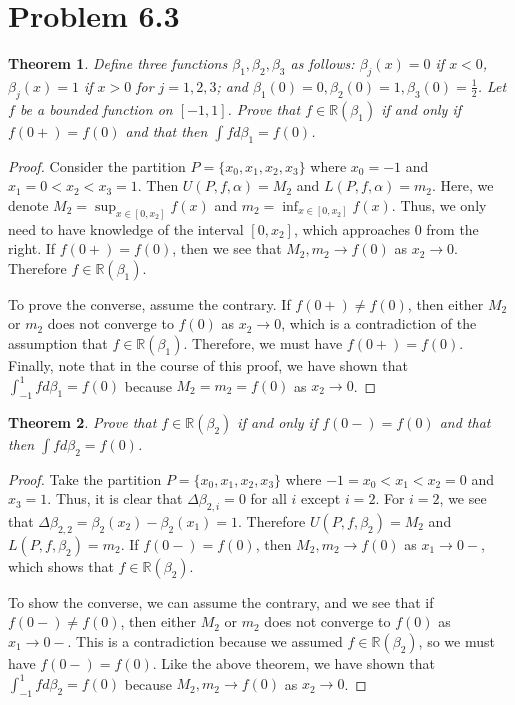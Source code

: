\documentclass[psamsfonts]{amsart}
\newtheorem{thm}{Theorem}[section]
\theoremstyle{definition}
\theoremstyle{remark}
\numberwithin{equation}{section}
\begin{document}
\section{Problem 6.3}

\begin{thm}
Define three functions $\beta_1, \beta_2, \beta_3$ as follows: $\beta_j(x) = 0$ if $x < 0$, $\beta_j(x) = 1$ if $x > 0$ for $j = 1,2,3$; and $\beta_1(0) = 0, \beta_2(0) = 1, \beta_3(0) = \frac{1}{2}$. Let $f$ be a bounded function on $[-1,1]$. Prove that $f \in \mathbb{R}(\beta_1)$ if and only if $f(0+) = f(0)$ and that then $\int f d\beta_1 = f(0)$.
\end{thm}

\begin{proof}
Consider the partition $P = \{ x_0, x_1, x_2, x_3 \}$ where $x_0 = -1$ and $x_1 = 0 < x_2 < x_3 = 1$. Then $U(P,f,\alpha) = M_2$ and $L(P,f,\alpha) = m_2$. Here, we denote $M_2 = \sup_{x \in [0,x_2]} f(x)$ and $m_2 = \inf_{x \in [0,x_2]} f(x)$. Thus, we only need to have knowledge of the interval $[0,x_2]$, which approaches $0$ from the right. If $f(0+) = f(0)$, then we see that $M_2, m_2 \to f(0)$ as $x_2 \to 0$. Therefore $f \in \mathbb{R}(\beta_1)$. 

To prove the converse, assume the contrary. If $f(0+) \neq f(0)$, then either $M_2$ or $m_2$ does not converge to $f(0)$ as $x_2 \to 0$, which is a contradiction of the assumption that $f \in \mathbb{R}(\beta_1)$. Therefore, we must have $f(0+) = f(0)$. Finally, note that in the course of this proof, we have shown that $\int_{-1}^1 f d \beta_1 = f(0)$ because $M_2 = m_2 = f(0)$ as $x_2 \to 0$. 
\end{proof}

\begin{thm}
Prove that $f \in \mathbb{R}(\beta_2)$ if and only if $f(0-) = f(0)$ and that then $\int f d \beta_2 = f(0)$. 
\end{thm}

\begin{proof}
Take the partition $P = \{ x_0, x_1, x_2, x_3 \}$ where $-1 = x_0 < x_1 < x_2 = 0$ and $x_3 = 1$. Thus, it is clear that $\Delta \beta_{2,i} = 0$ for all $i$ except $i=2$. For $i=2$, we see that $\Delta \beta_{2,2} = \beta_{2}(x_2) - \beta_2(x_1) = 1$. Therefore $U(P,f,\beta_2) = M_2$ and $L(P,f,\beta_2) = m_2$. If $f(0-) = f(0)$, then $M_2,m_2 \to f(0)$ as $x_1 \to 0-$, which shows that $f \in \mathbb{R}(\beta_2)$. 

To show the converse, we can assume the contrary, and we see that if $f(0-) \neq f(0)$, then either $M_2$ or $m_2$ does not converge to $f(0)$ as $x_1 \to 0-$. This is a contradiction because we assumed $f \in \mathbb{R}(\beta_2)$, so we must have $f(0-) = f(0)$. Like the above theorem, we have shown that $\int_{-1}^1 f d \beta_2 = f(0)$ because $M_2, m_2 \to f(0)$ as $x_2 \to 0$.
\end{proof}
\end{document}
